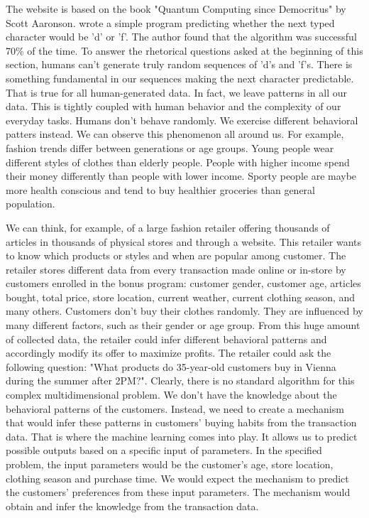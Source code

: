 \documentclass{BachelorBUI}
\begin{document}
        The website is based on the book "Quantum Computing since Democritus" by Scott Aaronson. \textcite{Aaronson:2013} wrote a simple program predicting whether the next typed character would be 'd' or 'f'. The author found that the algorithm was successful 70\% of the time. To answer the rhetorical questions asked at the beginning of this section, humans can't generate truly random sequences of 'd's and 'f's. There is something fundamental in our sequences making the next character predictable. That is true for all human-generated data. In fact, we leave patterns in all our data. This is tightly coupled with human behavior and the complexity of our everyday tasks. Humans don't behave randomly. We exercise different behavioral patters instead. We can observe this phenomenon all around us. For example, fashion trends differ between generations or age groups. Young people wear different styles of clothes than elderly people. People with higher income spend their money differently than people with lower income. Sporty people are maybe more health conscious and tend to buy healthier groceries than general population.

        We can think, for example, of a large fashion retailer offering thousands of articles in thousands of physical stores and through a website. This retailer wants to know which products or styles and when are popular among customer. The retailer stores different data from every transaction made online or in-store by customers enrolled in the bonus program: customer gender, customer age, articles bought, total price, store location, current weather, current clothing season, and many others. Customers don't buy their clothes randomly. They are influenced by many different factors, such as their gender or age group. From this huge amount of collected data, the retailer could infer different behavioral patterns and accordingly modify its offer to maximize profits. The retailer could ask the following question: "What products do 35-year-old customers buy in Vienna during the summer after 2PM?". Clearly, there is no standard algorithm for this complex multidimensional problem. We don't have the knowledge about the behavioral patterns of the customers. Instead, we need to create a mechanism that would infer these patterns in customers' buying habits from the transaction data. That is where the machine learning comes into play. It allows us to predict possible outputs based on a specific input of parameters. In the specified problem, the input parameters would be the customer's age, store location, clothing season and purchase time. We would expect the mechanism to predict the customers' preferences from these input parameters. The mechanism would obtain and infer the knowledge from the transaction data.
\end{document}
